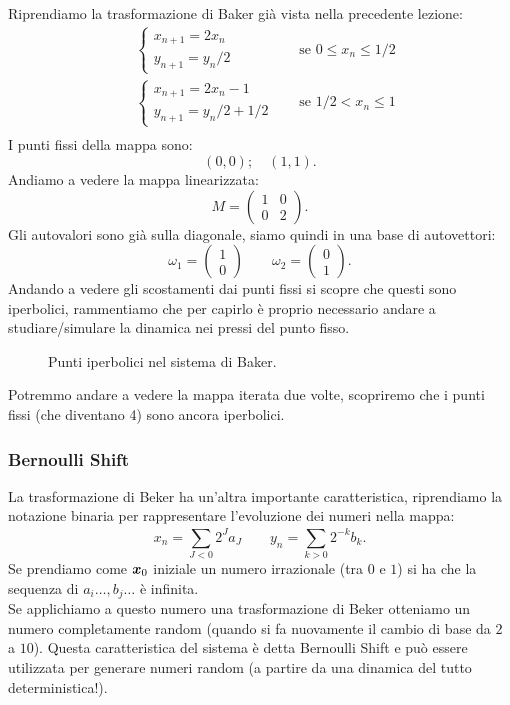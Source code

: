 \begin{exmp}
    Riprendiamo la trasformazione di Baker già vista nella precedente lezione:
    \[\begin{aligned}
	&
        \begin{cases}
            x_{n+1} = 2 x_n\\
	    y_{n+1} = y_n /2
	\end{cases} & \quad \text{se } 0 \le x_n \le  1 /2\\
	& 
        \begin{cases}
            x_{n+1} = 2 x_n - 1\\
	    y_{n+1} = y_n /2 + 1 /2
	\end{cases} & \quad \text{se } 1 /2 < x_n \le 1 \\
    \end{aligned}\]
    I punti fissi della mappa sono:
    \[
	(0, 0); \quad (1, 1)
    .\] 
    Andiamo a vedere la mappa linearizzata:
    \[
	M = 
        \begin{pmatrix} 
	    1 & 0 \\
	    0 & 2
	\end{pmatrix} 
    .\] 
    Gli autovalori sono già sulla diagonale, siamo quindi in una base di autovettori:
    \[
        \omega_1 = \begin{pmatrix} 1\\0 \end{pmatrix} \qquad
	\omega_2 = \begin{pmatrix} 0 \\1 \end{pmatrix} 
    .\] 
    Andando a vedere gli scostamenti dai punti fissi si scopre che questi sono iperbolici, rammentiamo che per capirlo è proprio necessario andare a studiare/simulare la dinamica nei pressi del punto fisso.
    \begin{figure}[H]
        \centering
        \caption{\scriptsize Punti iperbolici nel sistema di Baker.}
        \label{fig:22_baker}
    \end{figure}
    \noindent
    Potremmo andare a vedere la mappa iterata due volte, scopriremo che i punti fissi (che diventano 4) sono ancora iperbolici.
    \subsubsection{Bernoulli Shift}%
    \label{subsub:Bernoulli Shift}
    La trasformazione di Beker ha un'altra importante caratteristica, riprendiamo la notazione binaria per rappresentare l'evoluzione dei numeri nella mappa: 
    \[
        x_n = \sum_{J<0}^{} 2^{J}a_J \qquad y_n = \sum_{k>0}^{} 2^{-k} b_k
    .\]
    Se prendiamo come $\boldsymbol{x}_0$ iniziale un numero irrazionale (tra $0$ e $1$) si ha che la sequenza di $a_i\ldots, b_j\ldots$ è infinita. \\
    Se applichiamo a questo numero una trasformazione di Beker otteniamo un numero completamente random (quando si fa nuovamente il cambio di base da $2$ a $10$). Questa caratteristica del sistema è detta Bernoulli Shift e può essere utilizzata per generare numeri random (a partire da una dinamica del tutto deterministica!). 
\end{exmp}
\noindent

\clearpage
